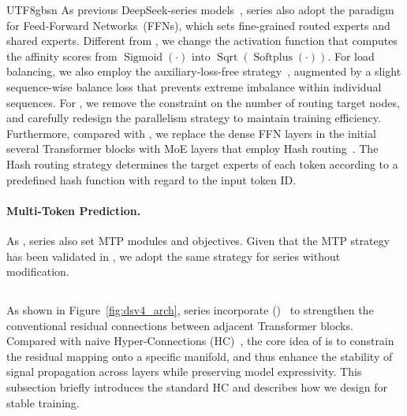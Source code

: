 \begin{CJK*}{UTF8}{gbsn}
As previous DeepSeek-series models~\citep{dsvii,dsv3}, \dsviv{} series also adopt the \dsmoe{} paradigm~\citep{deepseekmoe} for Feed-Forward Networks~(FFNs), which sets fine-grained routed experts and shared experts.
Different from \dsviii{}, we change the activation function that computes the affinity scores from $\operatorname{Sigmoid}(\cdot)$ into $\operatorname{Sqrt}(\operatorname{Softplus}(\cdot))$.
For load balancing, we also employ the auxiliary-loss-free strategy~\citep{noaux_tc,dsv3}, augmented by a slight sequence-wise balance loss that prevents extreme imbalance within individual sequences.
For \dsviv{}, we remove the constraint on the number of routing target nodes, and carefully redesign the parallelism strategy to maintain training efficiency.
Furthermore, compared with \dsviii{}, we replace the dense FFN layers in the initial several Transformer blocks with MoE layers that employ Hash routing~\citep{hash_layer}. 
The Hash routing strategy determines the target experts of each token according to a predefined hash function with regard to the input token ID.

\paragraph{Multi-Token Prediction.}

As \dsviii{}, \dsviv{} series also set MTP modules and objectives. 
Given that the MTP strategy has been validated in \dsviii{}, we adopt the same strategy for \dsviv{} series without modification.

\subsection{\mhcfull{}}

As shown in Figure~\ref{fig:dsv4_arch}, \dsviv{} series incorporate \mhcfull{} (\mhc{})~\citep{mhc} to strengthen the conventional residual connections between adjacent Transformer blocks. 
Compared with naive Hyper-Connections (HC)~\citep{hc}, the core idea of \mhc{} is to constrain the residual mapping onto a specific manifold, and thus enhance the stability of signal propagation across layers while preserving model expressivity.
This subsection briefly introduces the standard HC and describes how we design \mhc{} for stable training. 


\end{CJK*}
